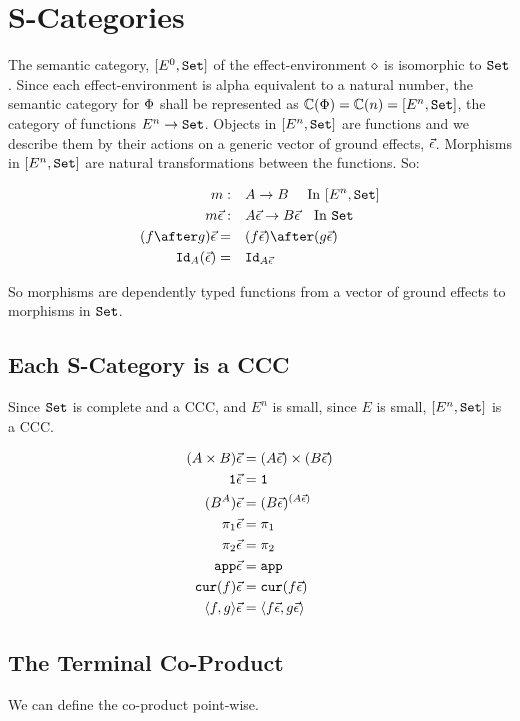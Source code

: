 \documentclass{report}
\begin{document}
\section{S-Categories}
The semantic category, $[E^0, \set]$ of the effect-environment $\nil$ is isomorphic to $\set$. Since each effect-environment is alpha equivalent to a natural number, the semantic category for $\P$ shall be represented as $\C(\P) = \C(n) = [E^n, \set]$, the category of functions $E^n\rightarrow \set$. Objects in $[E^n, \set]$ are functions and we describe them by their actions on a generic vector of ground effects, $\ev$. Morphisms in $[E^n, \set]$ are natural transformations between the functions. So:

\begin{align*}
    m:\quad&A \rightarrow B \qt{ In $[E^n, \set]$}\\
    m\ev:\quad& A\ev \rightarrow B\ev \qt{In $\set$}\\
    (f\after g)\ev =\quad& (f\ev)\after(g\ev)\\
    \Id{A}(\ev) =\quad& \Id{A\ev}
\end{align*}

So morphisms are dependently typed functions from a vector of ground effects to morphisms in $\set$.
\subsection{Each S-Category is a CCC}
Since $\set$ is complete and a CCC, and $E^n$ is small, since $E$ is small, $[E^n, \set]$ is a CCC.

\begin{align*}
    (A\times B)\ev & = (A\ev)\times(B\ev)\\
    \1\ev & = \1\\
    (B^A)\ev &= (B\ev)^{(A\ev)}\\
    \p\ev & = \p\\
    \pp\ev & = \pp\\
    \app\ev & = \app\\
    \cur{f}\ev & = \cur{f\ev}\\
    \pr{f}{g}\ev & = \pr{f\ev}{g\ev}\\
\end{align*}

\subsection{The Terminal Co-Product}

We can define the co-product point-wise.
\end{document}
